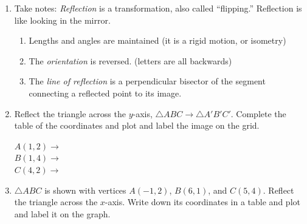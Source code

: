 \begin{enumerate}
\item Take notes: \emph{Reflection} is a transformation, also called ``flipping.'' Reflection is like looking in the mirror.
  \begin{enumerate}
    \item Lengths and angles are maintained (it is a rigid motion, or isometry)
    \item The \emph{orientation} is reversed. (letters are all backwards)
    \item The \emph{line of reflection} is a perpendicular bisector of the segment connecting a reflected point to its image.
  \end{enumerate}
  \begin{flushright}
  \end{flushright}
  
\item Reflect the triangle across the $y$-axis, $\triangle ABC \rightarrow \triangle A'B'C'$. Complete the table of the coordinates and plot and label the image on the grid. \vspace{0.5cm}
\begin{multicols}{2}
  $A(1,2) \rightarrow$ \\[0.7cm]
  $B(1,4) \rightarrow$ \\[0.7cm]
  $C(4,2) \rightarrow$ \\[0.7cm]
  \end{multicols}

\item $\triangle ABC$ is shown with vertices $A(-1,2)$, $B(6,1)$, and $C(5,4)$. Reflect the triangle across the $x$-axis. Write down its coordinates in a table and plot and label it on the graph.
  \begin{flushright}
    \end{flushright}


\end{enumerate}
